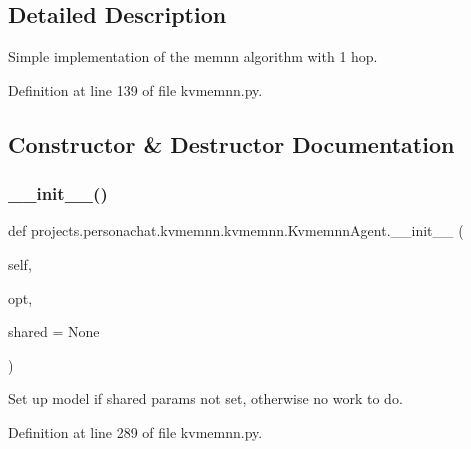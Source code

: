 \subsection{Detailed Description}
\begin{DoxyVerb}Simple implementation of the memnn algorithm with 1 hop.
\end{DoxyVerb}
 

Definition at line 139 of file kvmemnn.\+py.



\subsection{Constructor \& Destructor Documentation}
\mbox{\label{classprojects_1_1personachat_1_1kvmemnn_1_1kvmemnn_1_1KvmemnnAgent_ab1b2afa2c94021384b2f749e7441f588}} 
\subsubsection{\texorpdfstring{\+\_\+\+\_\+init\+\_\+\+\_\+()}{\_\_init\_\_()}}
{\footnotesize\ttfamily def projects.\+personachat.\+kvmemnn.\+kvmemnn.\+Kvmemnn\+Agent.\+\_\+\+\_\+init\+\_\+\+\_\+ (\begin{DoxyParamCaption}\item[{}]{self,  }\item[{}]{opt,  }\item[{}]{shared = {\ttfamily None} }\end{DoxyParamCaption})}

\begin{DoxyVerb}Set up model if shared params not set, otherwise no work to do.
\end{DoxyVerb}
 

Definition at line 289 of file kvmemnn.\+py.


